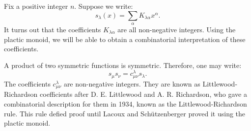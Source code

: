 \documentclass{amsart}
\theoremstyle{plain}
\theoremstyle{definition}
\theoremstyle{remark}
\begin{document}
Fix a positive integer $n$.
Suppose we write:
\begin{displaymath}
  s_\lambda(x) = \sum_{\alpha} K_{\lambda\alpha} x^\alpha.
\end{displaymath}
It turns out that the coefficients $K_{\lambda\alpha}$ are all non-negative integers.
Using the plactic monoid, we will be able to obtain a combinatorial interpretation of these coefficients.

A product of two symmetric functions is symmetric.
Therefore, one may write:
\begin{displaymath}
  s_\mu s_\nu = c^\lambda_{\mu\nu} s_\lambda.
\end{displaymath}
The coefficients $c^\lambda_{\mu\nu}$ are non-negative integers.
They are known as Littlewood-Richardson coefficients after D. E. Littlewood and A. R. Richardson, who gave a combinatorial description for them in 1934, known as the Littlewood-Richardson rule.
This rule defied proof until Lacoux and Sch\"utzenberger \cite{plaxique} proved it using the plactic monoid.
\end{document}
